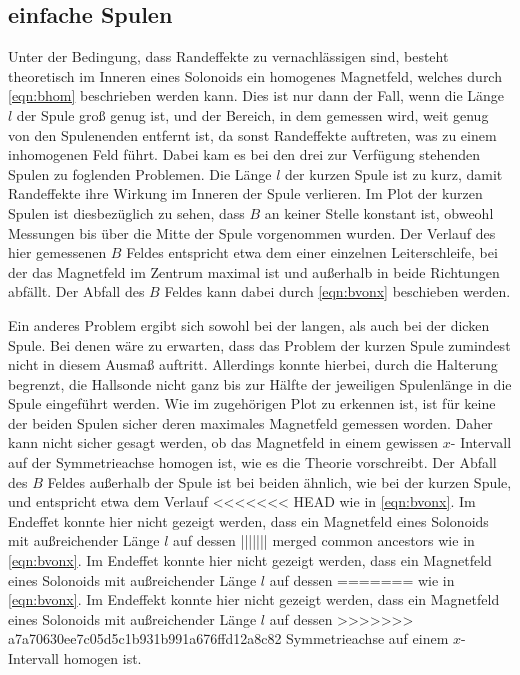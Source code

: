     \subsection{einfache Spulen}
        Unter der Bedingung, dass Randeffekte zu vernachlässigen sind, besteht theoretisch im Inneren eines Solonoids ein
        homogenes Magnetfeld, welches durch \eqref{eqn:bhom} beschrieben werden kann. Dies ist nur dann der Fall, wenn die Länge $l$
        der Spule groß genug ist, und der Bereich, in dem gemessen wird, weit genug von den Spulenenden entfernt ist, da sonst
        Randeffekte auftreten, was zu einem inhomogenen Feld führt. Dabei kam es bei den drei zur Verfügung stehenden Spulen zu
        foglenden Problemen. Die Länge $l$ der kurzen Spule ist zu kurz, damit Randeffekte ihre Wirkung im Inneren der Spule verlieren.
        Im Plot der kurzen Spulen ist diesbezüglich zu sehen, dass $B$ an keiner Stelle konstant ist, obweohl Messungen bis über die
        Mitte der Spule vorgenommen wurden. Der Verlauf des hier gemessenen $B$ Feldes entspricht etwa dem einer einzelnen Leiterschleife,
        bei der das Magnetfeld im Zentrum maximal ist und außerhalb in beide Richtungen abfällt. Der Abfall des $B$ Feldes kann dabei
        durch \eqref{eqn:bvonx} beschieben werden. 

        Ein anderes Problem ergibt sich sowohl bei der langen, als auch bei der dicken Spule. Bei denen wäre zu erwarten, dass 
        das Problem der kurzen Spule zumindest nicht in diesem Ausmaß auftritt. Allerdings konnte hierbei, durch die Halterung begrenzt,
        die Hallsonde nicht ganz bis zur Hälfte der jeweiligen Spulenlänge in die Spule eingeführt werden. Wie im zugehörigen Plot
        zu erkennen ist, ist für keine der beiden Spulen sicher deren maximales Magnetfeld gemessen worden. Daher kann nicht sicher 
        gesagt werden, ob das Magnetfeld in einem gewissen $x$- Intervall auf der Symmetrieachse homogen ist, wie es die Theorie vorschreibt.
        Der Abfall des $B$ Feldes außerhalb der Spule ist bei beiden ähnlich, wie bei der kurzen Spule, und entspricht etwa dem Verlauf
<<<<<<< HEAD
        wie in \eqref{eqn:bvonx}. 
        Im Endeffet konnte hier nicht gezeigt werden, dass ein Magnetfeld eines Solonoids mit außreichender Länge $l$ auf dessen
||||||| merged common ancestors
        wie in \ref{eqn:bvonx}. 
        Im Endeffet konnte hier nicht gezeigt werden, dass ein Magnetfeld eines Solonoids mit außreichender Länge $l$ auf dessen
=======
        wie in \ref{eqn:bvonx}. 
        Im Endeffekt konnte hier nicht gezeigt werden, dass ein Magnetfeld eines Solonoids mit außreichender Länge $l$ auf dessen
>>>>>>> a7a70630ee7c05d5c1b931b991a676ffd12a8c82
        Symmetrieachse auf einem $x$- Intervall homogen ist. 

